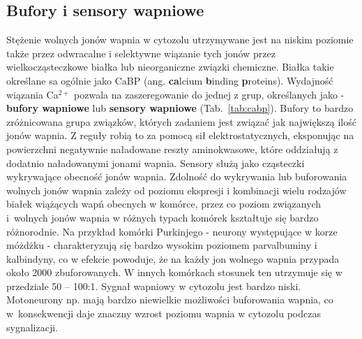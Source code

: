 \subsection{Bufory i sensory wapniowe}\label{ss:bufory}
Stężenie wolnych jonów wapnia w cytozolu utrzymywane jest na niskim poziomie także przez odwracalne i selektywne wiązanie tych jonów przez wielkocząsteczkowe białka lub nieorganiczne związki chemiczne. Białka takie określane sa ogólnie jako CaBP (ang. \textbf{ca}lcium \textbf{b}inding \textbf{p}roteins). Wydajność wiązania Ca$^{2+}$ pozwala na zaszeregowanie do jednej z grup, określanych jako - \textbf{bufory wapniowe} lub \textbf{sensory wapniowe} (Tab.~\ref{tab:cabp}). Bufory to bardzo zróżnicowana grupa związków, których zadaniem jest związać jak największą ilość jonów wapnia. Z reguły robią to za pomocą sił elektrostatycznych, eksponując na powierzchni negatywnie naładowane reszty aminokwasowe, które oddziałują z dodatnio naładowanymi jonami wapnia. Sensory służą jako cząsteczki wykrywające obecność jonów wapnia. Zdolność do wykrywania lub buforowania wolnych jonów wapnia zależy od poziomu ekspresji i kombinacji wielu rodzajów białek wiążących wapń obecnych w komórce, przez co poziom związanych i~wolnych jonów wapnia w różnych typach komórek kształtuje się bardzo różnorodnie. Na przykład komórki Purkinjego - neurony występujące w korze móżdżku - charakteryzują się bardzo wysokim poziomem parvalbuminy i kalbindyny, co w efekcie powoduje, że na każdy jon wolnego wapnia przypada około 2000 zbuforowanych. W innych komórkach stosunek ten utrzymuje się w przedziale 50 -- 100:1. Sygnał wapniowy w cytozolu jest bardzo niski. Motoneurony np. mają bardzo niewielkie możliwości buforowania wapnia, co w~konsekwencji daje znaczny wzrost poziomu wapnia w cytozolu podczas sygnalizacji. 



